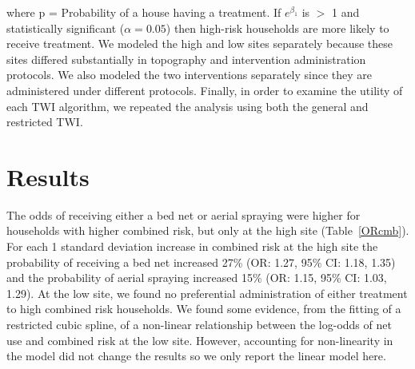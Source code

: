 \documentclass[10pt,letterpaper]{article}\usepackage[]{graphicx}\usepackage[]{color}
\begin{document}
where p  =  Probability of a house having a treatment.  If $e^{\beta_1}$ is $>$ 1 and statistically significant ($\alpha = 0.05$) then high-risk households are more likely to receive treatment.  %
We modeled the high and low sites separately because these sites differed substantially in topography and intervention administration protocols.  We also modeled the two interventions separately since they are administered under different protocols.  Finally, in order to examine the utility of each TWI algorithm, we repeated the analysis using both the general and restricted TWI.\\  %




























\section*{Results}
The odds of receiving either a bed net or aerial spraying were higher for households with higher combined risk,  but only at the high site (Table~\ref{ORcmb}).  For each 1 standard deviation increase in combined risk at the high site the probability of receiving a bed net increased 27\% (OR: 1.27,  95\% CI: 1.18,  1.35) and the probability of aerial spraying increased 15\% (OR: 1.15,  95\% CI: 1.03,  1.29).  At the low site,  we found no preferential administration of either treatment to high combined risk households.  We found some evidence,  from the fitting of a restricted cubic spline,  of a non-linear relationship between the log-odds of net use and combined risk at the low site.  However,  accounting for non-linearity in the model did not change the results so we only report the linear model here.\\ 
\end{document}
